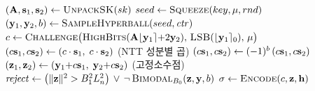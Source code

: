 \begin{algorithm}[H]
\caption{\texttt{HAETAE}.Sign (MODE2: $L{=}4$, $K{=}2$, $q{=}64513$, $L_n{=}2^{13}$). 오른쪽 주석은 오류 지점.}
\label{alg:sign}
\begin{algorithmic}[1]
\State $(\mathbf{A},\mathbf{s}_1,\mathbf{s}_2) \gets \textsc{UnpackSK}(sk)$
\State $seed \gets \textsc{Squeeze}(key,\mu,rnd)$
\Repeat
  \State $(\mathbf{y}_1,\mathbf{y}_2,b) \gets \textsc{SampleHyperball}(seed,\mathit{ctr})$
  \State $c \gets \textsc{Challenge}\big(\textsc{HighBits}(\mathbf{A}\lfloor\mathbf{y}_1\rceil{+}2\mathbf{y}_2),\,\textsc{LSB}(\lfloor\mathbf{y}_1\rceil_0),\,\mu\big)$
  \State $(c\mathbf{s}_1,c\mathbf{s}_2) \gets (c\cdot\mathbf{s}_1,\; c\cdot\mathbf{s}_2)$ \quad(NTT 성분별 곱)
  \State $(c\mathbf{s}_1,c\mathbf{s}_2) \gets (-1)^b\,(c\mathbf{s}_1,c\mathbf{s}_2)$
  \State $(\mathbf{z}_1,\mathbf{z}_2) \gets (\mathbf{y}_1{+}c\mathbf{s}_1,\; \mathbf{y}_2{+}c\mathbf{s}_2)$ \quad(고정소수점)
  \State $\mathit{reject} \gets \big(\lVert\mathbf{z}\rVert^2 > B_1^2 L_n^2\big) \,\lor\, \neg\,\textsc{Bimodal}_{B_0}(\mathbf{z},\mathbf{y},b)$
\State \Return $\sigma \gets \textsc{Encode}(c,\mathbf{z},\mathbf{h})$
\end{algorithmic}
\end{algorithm}

